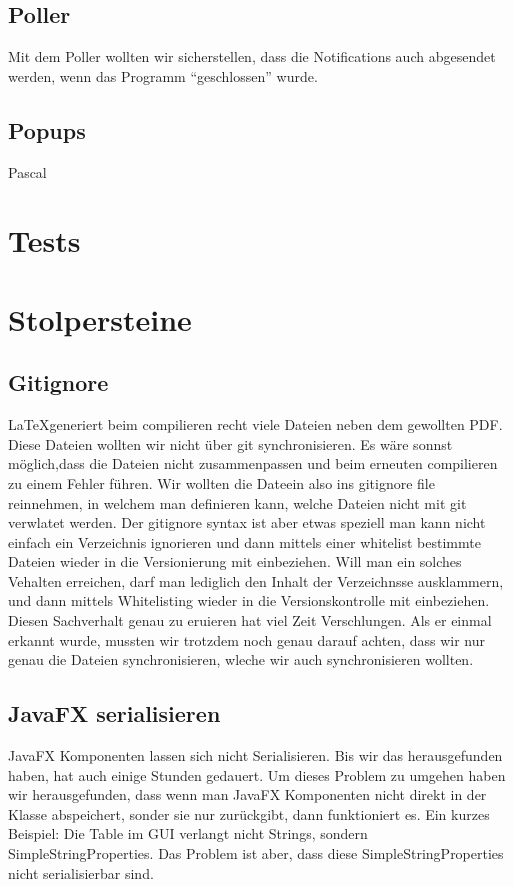 \documentclass[11pt,titelpage]{scrartcl}
\begin{document}
\subsection{Poller}
Mit dem Poller wollten wir sicherstellen, dass die Notifications auch abgesendet werden, wenn das Programm ``geschlossen'' wurde.
\subsection{Popups}
Pascal
\section{Tests}
\section{Stolpersteine}
\subsection{Gitignore}
\LaTeX generiert beim compilieren recht viele Dateien neben dem gewollten PDF. Diese Dateien wollten wir nicht über git synchronisieren. Es wäre sonnst möglich,dass die Dateien nicht zusammenpassen und beim erneuten compilieren zu einem Fehler führen. Wir wollten die Dateein also ins gitignore file reinnehmen, in welchem man definieren kann, welche Dateien nicht mit git verwlatet werden.
Der gitignore syntax ist aber etwas speziell man kann nicht einfach ein  Verzeichnis ignorieren und dann mittels einer whitelist bestimmte Dateien wieder in die Versionierung mit einbeziehen. Will man ein solches Vehalten erreichen, darf man lediglich den Inhalt der Verzeichnsse ausklammern, und dann mittels Whitelisting wieder in die Versionskontrolle mit einbeziehen. Diesen Sachverhalt genau zu eruieren hat viel Zeit Verschlungen. Als er einmal erkannt wurde, mussten wir trotzdem noch genau darauf achten, dass wir nur genau die Dateien synchronisieren, wleche wir auch synchronisieren wollten.
\subsection{JavaFX serialisieren}
JavaFX Komponenten lassen sich nicht Serialisieren. Bis wir das herausgefunden haben, hat auch einige Stunden gedauert. Um dieses Problem zu umgehen haben wir herausgefunden, dass
wenn man JavaFX Komponenten nicht direkt in der Klasse abspeichert, sonder sie nur zurückgibt, dann funktioniert es. Ein kurzes Beispiel:
Die Table im GUI verlangt nicht Strings, sondern SimpleStringProperties. Das Problem ist aber, dass diese SimpleStringProperties nicht serialisierbar sind.
\end{document}
